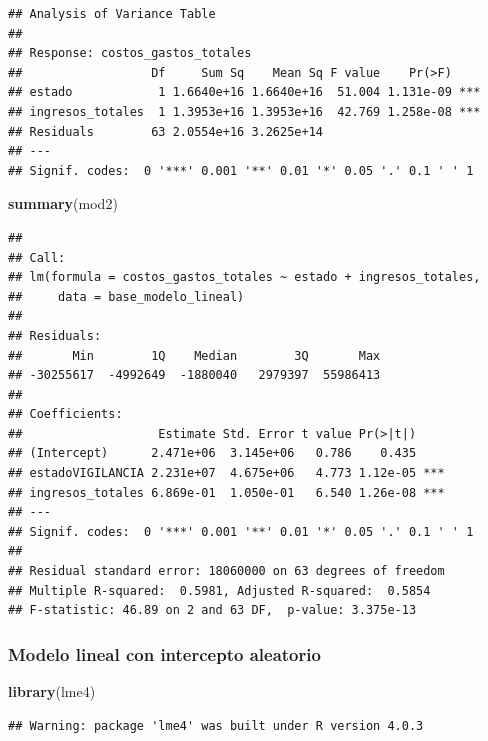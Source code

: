 \documentclass[
  11pt,
]{article}
\newenvironment{Shaded}{\begin{snugshade}}{\end{snugshade}}
\newcommand{\KeywordTok}[1]{\textcolor[rgb]{0.13,0.29,0.53}{\textbf{#1}}}
\newcommand{\NormalTok}[1]{#1}
\begin{document}
\begin{verbatim}
## Analysis of Variance Table
## 
## Response: costos_gastos_totales
##                  Df     Sum Sq    Mean Sq F value    Pr(>F)    
## estado            1 1.6640e+16 1.6640e+16  51.004 1.131e-09 ***
## ingresos_totales  1 1.3953e+16 1.3953e+16  42.769 1.258e-08 ***
## Residuals        63 2.0554e+16 3.2625e+14                      
## ---
## Signif. codes:  0 '***' 0.001 '**' 0.01 '*' 0.05 '.' 0.1 ' ' 1
\end{verbatim}

\begin{Shaded}
\begin{Highlighting}[]
\KeywordTok{summary}\NormalTok{(mod2)}
\end{Highlighting}
\end{Shaded}

\begin{verbatim}
## 
## Call:
## lm(formula = costos_gastos_totales ~ estado + ingresos_totales, 
##     data = base_modelo_lineal)
## 
## Residuals:
##       Min        1Q    Median        3Q       Max 
## -30255617  -4992649  -1880040   2979397  55986413 
## 
## Coefficients:
##                   Estimate Std. Error t value Pr(>|t|)    
## (Intercept)      2.471e+06  3.145e+06   0.786    0.435    
## estadoVIGILANCIA 2.231e+07  4.675e+06   4.773 1.12e-05 ***
## ingresos_totales 6.869e-01  1.050e-01   6.540 1.26e-08 ***
## ---
## Signif. codes:  0 '***' 0.001 '**' 0.01 '*' 0.05 '.' 0.1 ' ' 1
## 
## Residual standard error: 18060000 on 63 degrees of freedom
## Multiple R-squared:  0.5981, Adjusted R-squared:  0.5854 
## F-statistic: 46.89 on 2 and 63 DF,  p-value: 3.375e-13
\end{verbatim}

\hypertarget{modelo-lineal-con-intercepto-aleatorio}{%
\subsubsection{Modelo lineal con intercepto
aleatorio}\label{modelo-lineal-con-intercepto-aleatorio}}

\begin{Shaded}
\begin{Highlighting}[]
\KeywordTok{library}\NormalTok{(lme4)}
\end{Highlighting}
\end{Shaded}

\begin{verbatim}
## Warning: package 'lme4' was built under R version 4.0.3
\end{verbatim}
\end{document}
